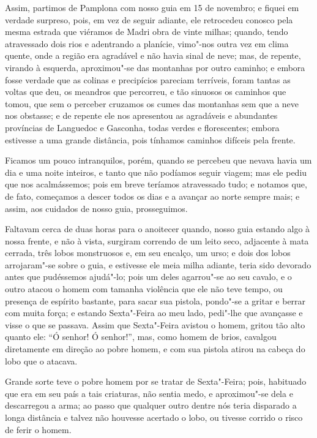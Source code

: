 Assim, partimos de Pamplona com nosso guia em 15 de novembro; e fiquei
em verdade surpreso, pois, em vez de seguir adiante, ele retrocedeu
conosco pela mesma estrada que viéramos de Madri obra de vinte milhas;
quando, tendo atravessado dois rios e adentrando a planície, vimo"-nos
outra vez em clima quente, onde a região era agradável e não havia sinal
de neve; mas, de repente, virando à esquerda, aproximou"-se das montanhas
por outro caminho; e embora fosse verdade que as colinas e precipícios
pareciam terríveis, foram tantas as voltas que deu, os meandros que
percorreu, e tão sinuosos os caminhos que tomou, que sem o perceber
cruzamos os cumes das montanhas sem que a neve nos obstasse; e de
repente ele nos apresentou as agradáveis e abundantes províncias de
Languedoc e Gasconha, todas verdes e florescentes; embora estivesse a
uma grande distância, pois tínhamos caminhos difíceis pela frente.

Ficamos um pouco intranquilos, porém, quando se percebeu que nevava
havia um dia e uma noite inteiros, e tanto que não podíamos seguir
viagem; mas ele pediu que nos acalmássemos; pois em breve teríamos
atravessado tudo; e notamos que, de fato, começamos a descer todos os
dias e a avançar ao norte sempre mais; e assim, aos cuidados de nosso
guia, prosseguimos.

Faltavam cerca de duas horas para o anoitecer quando, nosso guia estando
algo à nossa frente, e não à vista, surgiram correndo de um leito seco,
adjacente à mata cerrada, três lobos monstruosos e, em seu encalço, um
urso; e dois dos lobos arrojaram"-se sobre o guia, e estivesse ele meia
milha adiante, teria sido devorado antes que pudéssemos ajudá"-lo; pois
um deles agarrou"-se ao seu cavalo, e o outro atacou o homem com tamanha
violência que ele não teve tempo, ou presença de espírito bastante, para
sacar sua pistola, pondo"-se a gritar e berrar com muita força; e estando
Sexta"-Feira ao meu lado, pedi"-lhe que avançasse e visse o que se
passava. Assim que Sexta"-Feira avistou o homem, gritou tão alto quanto
ele: ``Ó senhor! Ó senhor!'', mas, como homem de brios, cavalgou
diretamente em direção ao pobre homem, e com sua pistola atirou na
cabeça do lobo que o atacava.

Grande sorte teve o pobre homem por se tratar de Sexta"-Feira; pois,
habituado que era em seu país a tais criaturas, não sentia medo, e
aproximou"-se dela e descarregou a arma; ao passo que qualquer outro
dentre nós teria disparado a longa distância e talvez não houvesse
acertado o lobo, ou tivesse corrido o risco de ferir o homem.


